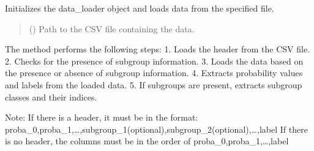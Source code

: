 \documentclass[letterpaper,10pt,english]{sphinxmanual}
\begin{document}
\begin{fulllineitems}
\begin{fulllineitems}
\end{fulllineitems}


\begin{fulllineitems}
\label{\detokenize{calzone:id0}}
\pysigstartsignatures
{}
\pysigstopsignatures
\sphinxAtStartPar
Initializes the data\_loader object and loads data from the specified file.
\begin{quote}\begin{description}
\sphinxAtStartPar
{} () \textendash{} Path to the CSV file containing the data.

\end{description}\end{quote}

\sphinxAtStartPar
The method performs the following steps:
1. Loads the header from the CSV file.
2. Checks for the presence of subgroup information.
3. Loads the data based on the presence or absence of subgroup information.
4. Extracts probability values and labels from the loaded data.
5. If subgroups are present, extracts subgroup classes and their indices.

\sphinxAtStartPar
Note:
\sphinxhyphen{} If there is a header, it must be in the format: proba\_0,proba\_1,…,subgroup\_1(optional),subgroup\_2(optional),…,label
\sphinxhyphen{} If there is no header, the columns must be in the order of proba\_0,proba\_1,…,label

\end{fulllineitems}


\end{fulllineitems}

\end{document}
